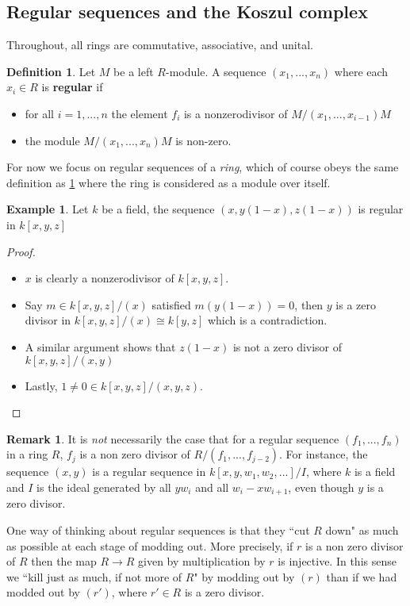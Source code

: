 \documentclass[12pt]{article}
\theoremstyle{plain}
\theoremstyle{definition}
\newtheorem{defn}[thm]{Definition} %
\newtheorem{remark}[thm]{Remark}
\newtheorem{example}[thm]{Example}
\begin{document}
	\subsection{Regular sequences and the Koszul complex}
	Throughout, all rings are commutative, associative, and unital.
	\begin{defn}\label{def:regular_sequence}
		Let $M$ be a left $R$-module. A sequence $(x_1,...,x_n)$ where each $x_i \in R$ is \textbf{regular} if
		\begin{itemize}
			\item for all $i = 1,...,n$ the element $f_i$ is a nonzerodivisor of $M/(x_1,...,x_{i-1})M$
			\item the module $M/(x_1,...,x_n)M$ is non-zero.
		\end{itemize}
	\end{defn}
	For now we focus on regular sequences of a \emph{ring}, which of course obeys the same definition as \ref{def:regular_sequence} where the ring is considered as a module over itself.
	\begin{example}
		Let $k$ be a field, the sequence $(x,y(1-x),z(1-x))$ is regular in $k[x,y,z]$
	\end{example}
	\begin{proof}
		\begin{itemize}
			\item $x$ is clearly a nonzerodivisor of $k[x,y,z]$.
			\item Say $m \in k[x,y,z]/(x)$ satisfied $m(y(1-x)) = 0$, then $y$ is a zero divisor in $k[x,y,z]/(x) \cong k[y,z]$ which is a contradiction.
			\item A similar argument shows that $z(1-x)$ is not a zero divisor of $k[x,y,z]/(x,y)$
			\item Lastly, $1 \neq 0 \in k[x,y,z]/(x,y,z)$.
		\end{itemize}
	\end{proof}
	\begin{remark}
		It is \emph{not} necessarily the case that for a regular sequence $(f_1,...,f_n)$ in a ring $R$, $f_j$ is a non zero divisor of $R/(f_1,...,f_{j-2})$. For instance, the sequence $(x,y)$ is a regular sequence in $k[x,y,w_1,w_2,...]/I$, where $k$ is a field and $I$ is the ideal generated by all $yw_i$ and all $w_i - xw_{i+1}$, even though $y$ is a zero divisor.
	\end{remark}
	One way of thinking about regular sequences is that they ``cut $R$ down" as much as possible at each stage of modding out. More precisely, if $r$ is a non zero divisor of $R$ then the map $R \to R$ given by multiplication by $r$ is injective. In this sense we ``kill just as much, if not more of $R$" by modding out by $(r)$ than if we had modded out by $(r')$, where $r' \in R$ is a zero divisor.
\end{document}
